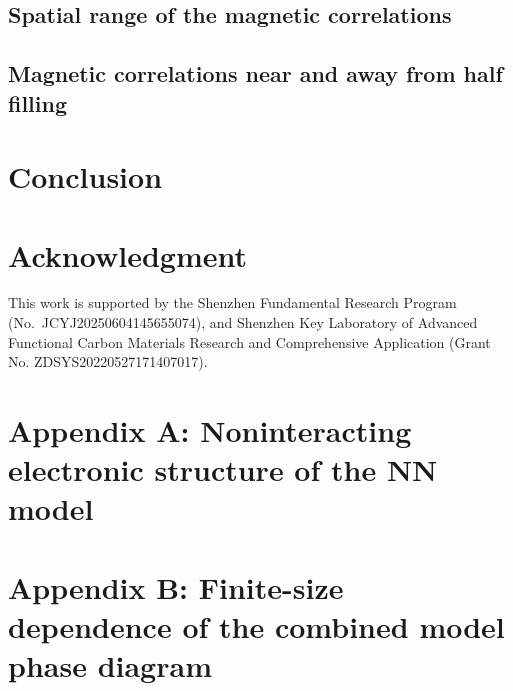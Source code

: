 \documentclass[reprint,superscriptaddress,amsmath,amssymb,aps,prb,longbibliography]{revtex4-2}
\begin{document}
\subsection{Spatial range of the magnetic correlations}
\label{sec:Rp_real}


\subsection{Magnetic correlations near and away from half filling}
\label{sec:regimes}


\section{Conclusion}

\section*{Acknowledgment}
This work is supported by the Shenzhen Fundamental Research Program (No.~JCYJ20250604145655074), and Shenzhen Key Laboratory of Advanced Functional Carbon Materials Research and Comprehensive Application (Grant No. ZDSYS20220527171407017).


\appendix
\section*{Appendix A: Noninteracting electronic structure of the NN model}
\label{app:noninteracting}

\section*{Appendix B: Finite-size dependence of the combined model phase diagram}
\label{app:finite_size}



% 

\end{document}
